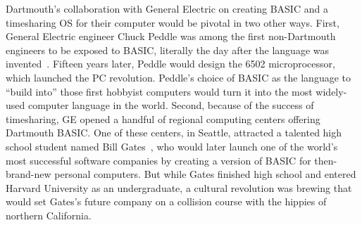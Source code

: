 Dartmouth's collaboration with General Electric on creating BASIC and
a timesharing OS for their computer would be pivotal in two other
ways.
First, General Electric engineer Chuck Peddle was among the first
non-Dartmouth engineers to be exposed to BASIC, literally the day
after the language was invented~\cite[p.~5]{commodore}.
Fifteen years later, Peddle would design the 6502 microprocessor,
which launched the PC revolution.  Peddle's choice of
BASIC as the language to ``build into'' those first hobbyist computers would turn it
into the most widely-used computer language in the world.
Second, because of the success of timesharing, GE opened a handful of
regional computing centers offering Dartmouth BASIC.
One of these centers, in Seattle, attracted a talented high school
student named Bill Gates~\cite{basic_history_gdm}, who would later launch one of the
world's most successful software companies by creating a
version of BASIC for then-brand-new personal computers.
But while Gates finished high school and entered Harvard University as
an undergraduate, a cultural revolution was brewing that would set
Gates's future company on a collision course with the hippies of
northern California.
